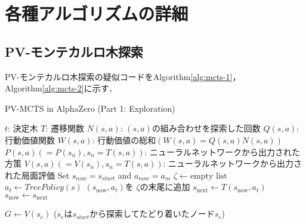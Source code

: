 \chapter{各種アルゴリズムの詳細}
\label{chap:alg}
\section{PV-モンテカルロ木探索}
PV-モンテカルロ木探索の疑似コードをAlgorithm\ref{alg:mcts-1}，Algorithm\ref{alg:mcts-2}に示す．
\begin{algorithm}
    \caption{PV-MCTS in AlphaZero (Part 1: Exploration)}
    \label{alg:mcts-1}
    \begin{algorithmic}[1]
        \State $t$: 決定木
        \State $T$: 遷移関数
        \State $N(s, a)$: $(s, a)$の組み合わせを探索した回数
        \State $Q(s, a)$: 行動価値関数 
        \State $W(s, a)$: 行動価値の総和$(W(s, a)=Q(s, a)N(s, a))$
        \State $P(s, a)(=P(s_n), s_n=T(s, a))$: 
        \State ニューラルネットワークから出力された方策
        \State $V(s, a)(=V(s_n), s_n=T(s, a))$: 
        \State ニューラルネットワークから出力された局面評価
            \State Set $s_{now} = s_{start}$ and $a_{now} = a_m$
                \State $\zeta \gets \textrm{empty list}$
                    \State $a_t \gets TreePolicy(s)$
                    \State $(s_{\text{now}}, a_t)$を $\zeta $の末尾に追加
                    \State $s_{\text{next}} \gets T(s_{\text{now}}, a_t)$
                    \State $s_{\text{now}} \gets s_{\text{next}}$
                    
                \EndWhile
                \State $G \gets V(s_e)$ 
                \State($s_e$は$s_{start}$から探索してたどり着いたノード$s_e$)
                \State {}
            \EndFor
        \EndFunction
        
        
    \end{algorithmic}
\end{algorithm}
